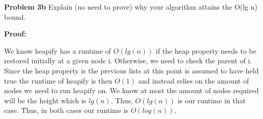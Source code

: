 \documentclass[12pt]{article}
\begin{document}
\rightline{$\blacksquare$}

\par


\par
\bigskip
{\bf Problem
    3b
}
Explain (no need to prove) why your algorithm attains the O(lg n) bound.

\par
\bigskip
{\bf Proof:}
\par
\hline
We know heapify has a runtime of $O(lg(n))$ if the heap property 
needs to be restored initially at a given node i. Otherwise, 
we need to check the parent of i. Since the heap property is the 
previous lists at this point is assumed to have held true the 
runtime of heapify is then $O(1)$ and instead relies on the 
amount of nodes we need to run heapify on. We know at most 
the amount of nodes required will be the height which is $lg(n)$.
Thus, $O(lg(n))$ is our runtime in that case. Thus, in both cases 
our runtime is $O(log(n))$.\\

\rightline{$\blacksquare$}

\par
\end{document}
